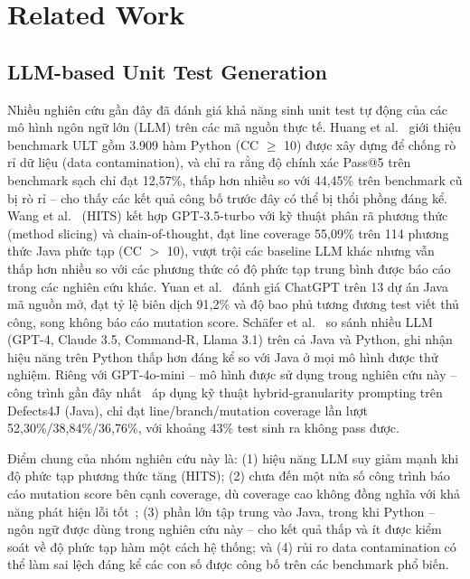 \section{Related Work}
\label{sec:related}

\subsection{LLM-based Unit Test Generation}
\label{subsec:related-llm}

Nhiều nghiên cứu gần đây đã đánh giá khả năng sinh unit test tự động của các mô hình ngôn ngữ lớn (LLM) trên các mã nguồn thực tế. Huang et al.~\cite{huang2026ult} giới thiệu benchmark ULT gồm 3.909 hàm Python (CC $\geq$ 10) được xây dựng để chống rò rỉ dữ liệu (data contamination), và chỉ ra rằng độ chính xác Pass@5 trên benchmark sạch chỉ đạt 12,57\%, thấp hơn nhiều so với 44,45\% trên benchmark cũ bị rò rỉ -- cho thấy các kết quả công bố trước đây có thể bị thổi phồng đáng kể. Wang et al.~\cite{wang2024hits} (HITS) kết hợp GPT-3.5-turbo với kỹ thuật phân rã phương thức (method slicing) và chain-of-thought, đạt line coverage 55,09\% trên 114 phương thức Java phức tạp (CC $>$ 10), vượt trội các baseline LLM khác nhưng vẫn thấp hơn nhiều so với các phương thức có độ phức tạp trung bình được báo cáo trong các nghiên cứu khác. Yuan et al.~\cite{yuan2024nomoretests} đánh giá ChatGPT trên 13 dự án Java mã nguồn mở, đạt tỷ lệ biên dịch 91,2\% và độ bao phủ tương đương test viết thủ công, song không báo cáo mutation score. Schäfer et al.~\cite{schafer2024empirical} so sánh nhiều LLM (GPT-4, Claude 3.5, Command-R, Llama 3.1) trên cả Java và Python, ghi nhận hiệu năng trên Python thấp hơn đáng kể so với Java ở mọi mô hình được thử nghiệm. Riêng với GPT-4o-mini -- mô hình được sử dụng trong nghiên cứu này -- công trình gần đây nhất~\cite{fse2025gpt4ominigranularity} áp dụng kỹ thuật hybrid-granularity prompting trên Defects4J (Java), chỉ đạt line/branch/mutation coverage lần lượt 52,30\%/38,84\%/36,76\%, với khoảng 43\% test sinh ra không pass được.

Điểm chung của nhóm nghiên cứu này là: (1) hiệu năng LLM suy giảm mạnh khi độ phức tạp phương thức tăng (HITS); (2) chưa đến một nửa số công trình báo cáo mutation score bên cạnh coverage, dù coverage cao không đồng nghĩa với khả năng phát hiện lỗi tốt~\cite{huang2026ult}; (3) phần lớn tập trung vào Java, trong khi Python -- ngôn ngữ được dùng trong nghiên cứu này -- cho kết quả thấp và ít được kiểm soát về độ phức tạp hàm một cách hệ thống; và (4) rủi ro data contamination có thể làm sai lệch đáng kể các con số được công bố trên các benchmark phổ biến.

